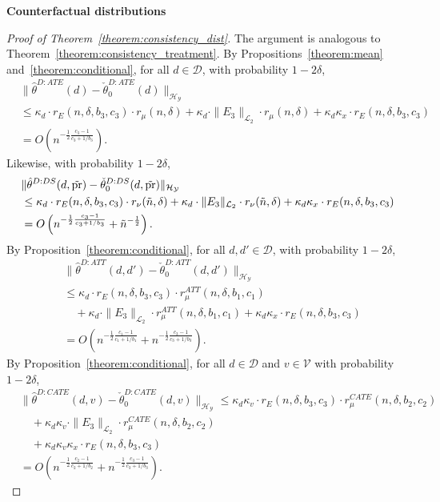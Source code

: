 \textbf{Counterfactual distributions}


\begin{proof}[Proof of Theorem~\ref{theorem:consistency_dist}]
   The argument is analogous to Theorem~\ref{theorem:consistency_treatment}. By Propositions~\ref{theorem:mean} and~\ref{theorem:conditional}, for all $d\in\mathcal{D}$, with probability $1-2\delta$,
   \begin{align*}
       &\|\hat{\theta}^{D:ATE}(d)-\check{\theta}_0^{D:ATE}(d)\|_{\mathcal{H}_{\mathcal{Y}}}
      \\
      &\leq \kappa_d \cdot r_{E}(n,\delta,b_3,c_3) \cdot r_{\mu}(n,\delta)+\kappa_d\cdot\|E_3\|_{\mathcal{L}_2} \cdot r_{\mu}(n,\delta)
    +\kappa_d\kappa_x \cdot r_{E}(n,\delta,b_3,c_3)\\
      &=O\left(n^{-\frac{1}{2}\frac{c_3-1}{c_3+1/b_3}}\right).
   \end{align*}
Likewise, with probability $1-2\delta$,
    \begin{align*}
   &\|\hat{\theta}^{D:DS}(d,\tilde{\text{\normalfont pr}})-\check{\theta}_0^{D:DS}(d,\tilde{\text{\normalfont pr}})\|_{\mathcal{H}_{\mathcal{Y}}} \\
   &\leq
   \kappa_d \cdot r_{E}(n,\delta,b_3,c_3) \cdot r_{\nu}(\tilde{n},\delta)+\kappa_d\cdot\|E_3\|_{\mathcal{L}_2} \cdot r_{\nu}(\tilde{n},\delta)
    +\kappa_d\kappa_x \cdot r_{E}(n,\delta,b_3,c_3)\\
      &=O\left(n^{-\frac{1}{2}\frac{c_3-1}{c_3+1/b_3}}+\tilde{n}^{-\frac{1}{2}}\right).
    \end{align*}
By Proposition~\ref{theorem:conditional}, for all $d,d'\in\mathcal{D}$, with probability $1-2\delta$,
   \begin{align*}
       &\|\hat{\theta}^{D:ATT}(d,d')-\check{\theta}_0^{D:ATT}(d,d')\|_{\mathcal{H}_{\mathcal{Y}}}
      \\
      &\leq \kappa_d \cdot r_{E}(n,\delta,b_3,c_3) \cdot r^{ATT}_{\mu}(n,\delta,b_1,c_1) \\
      &\quad +\kappa_d\cdot\|E_3\|_{\mathcal{L}_2} \cdot r^{ATT}_{\mu}(n,\delta,b_1,c_1) 
      +\kappa_d\kappa_x \cdot r_{E}(n,\delta,b_3,c_3)\\
      &=O\left(n^{-\frac{1}{2}\frac{c_1-1}{c_1+1/b_1}}+n^{-\frac{1}{2}\frac{c_3-1}{c_3+1/b_3}}\right).
   \end{align*}
By Proposition~\ref{theorem:conditional}, for all $d\in\mathcal{D}$ and $v\in\mathcal{V}$ with probability $1-2\delta$,
   \begin{align*}
       &\|\hat{\theta}^{D:CATE}(d,v)-\check{\theta}_0^{D:CATE}(d,v)\|_{\mathcal{H}_{\mathcal{Y}}}
      \leq \kappa_d\kappa_{v} \cdot r_{E}(n,\delta,b_3,c_3) \cdot r_{\mu}^{CATE}(n,\delta,b_2,c_2) \\
      &\quad +\kappa_d\kappa_{v}\cdot\|E_3\|_{\mathcal{L}_2} \cdot r_{\mu}^{CATE}(n,\delta,b_2,c_2) \\
      &\quad +\kappa_d\kappa_{v} \kappa_{x} \cdot r_{E}(n,\delta,b_3,c_3)
      \\
      &=O\left(n^{-\frac{1}{2}\frac{c_2-1}{c_2+1/b_2}}+n^{-\frac{1}{2}\frac{c_3-1}{c_3+1/b_3}}\right).
   \end{align*}
      
\end{proof}

